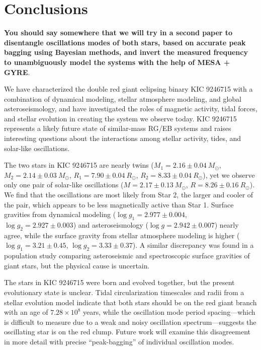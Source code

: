 \section{Conclusions}\label{conclude}
{\textbf{You should say somewhere that we will try in a second paper to disentangle oscillations modes of both stars, based on accurate peak bagging using Bayesian methods, and invert the measured frequency to unambiguously model the systems with the help of MESA + GYRE}}.

We have characterized the double red giant eclipsing binary KIC 9246715 with a combination of dynamical modeling, stellar atmosphere modeling, and global asteroseismology, and have investigated the roles of magnetic activity, tidal forces, and stellar evolution in creating the system we observe today. KIC 9246715 represents a likely future state of similar-mass RG/EB systems and raises interesting questions about the interactions among stellar activity, tides, and solar-like oscillations.

The two stars in KIC 9246715 are nearly twins ($M_1 = 2.16 \pm 0.04\ M_{\odot}$, $M_2 = 2.14 \pm 0.03\ M_{\odot}$, $R_1 = 7.90 \pm 0.04 \ R_{\odot}$, $R_2 = 8.33 \pm 0.04 \ R_{\odot}$), yet we observe only one pair of solar-like oscillations ($M = 2.17 \pm 0.13 \ M_{\odot}$, $R = 8.26 \pm 0.16 \ R_{\odot}$). We find that the oscillations are most likely from Star 2, the larger and cooler of the pair, which appears to be less magnetically active than Star 1. Surface gravities from dynamical modeling ($\log g_1 = 2.977 \pm 0.004$, $\log g_2 = 2.927 \pm 0.003$) and asteroseismology ($\log g = 2.942 \pm 0.007$) nearly agree, while the surface gravity from stellar atmosphere modeling is higher ($\log g_1 = 3.21 \pm 0.45$, $\log g_2 = 3.33 \pm 0.37$). A similar discrepancy was found in a population study comparing asteroseismic and spectroscopic surface gravities of giant stars, but the physical cause is uncertain.

The stars in KIC 9246715 were born and evolved together, but the present evolutionary state is unclear. Tidal circularization timescales and radii from a stellar evolution model indicate that both stars should be on the red giant branch with an age of $7.28 \times 10^8$ years, while the oscillation mode period spacing---which is difficult to measure due to a weak and noisy oscillation spectrum---suggests the oscillating star is on the red clump. Future work will examine this disagreement in more detail with precise ``peak-bagging'' of individual oscillation modes.

